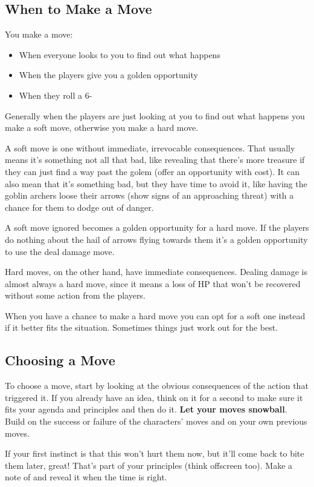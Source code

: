 \subsection{When to Make a Move}

You make a move:
\begin{itemize}
\item When everyone looks to you to find out what happens
\item When the players give you a golden opportunity
\item When they roll a 6-

\end{itemize}

Generally when the players are just looking at you to find out what happens you make a soft move, otherwise you make a hard move.

A soft move is one without immediate, irrevocable consequences. That usually means it's something not all that bad, like revealing that there's more treasure if they can just find a way past the golem (offer an opportunity with cost). It can also mean that it's something bad, but they have time to avoid it, like having the goblin archers loose their arrows (show signs of an approaching threat) with a chance for them to dodge out of danger.

A soft move ignored becomes a golden opportunity for a hard move. If the players do nothing about the hail of arrows flying towards them it's a golden opportunity to use the deal damage move.

Hard moves, on the other hand, have immediate consequences. Dealing damage is almost always a hard move, since it means a loss of HP that won't be recovered without some action from the players.

When you have a chance to make a hard move you can opt for a soft one instead if it better fits the situation. Sometimes things just work out for the best.
\subsection{Choosing a Move}

To choose a move, start by looking at the obvious consequences of the action that triggered it. If you already have an idea, think on it for a second to make sure it fits your agenda and principles and then do it. \textbf{Let your moves snowball}. Build on the success or failure of the characters' moves and on your own previous moves.

If your first instinct is that this won't hurt them now, but it'll come back to bite them later, great! That's part of your principles (think offscreen too). Make a note of and reveal it when the time is right.
